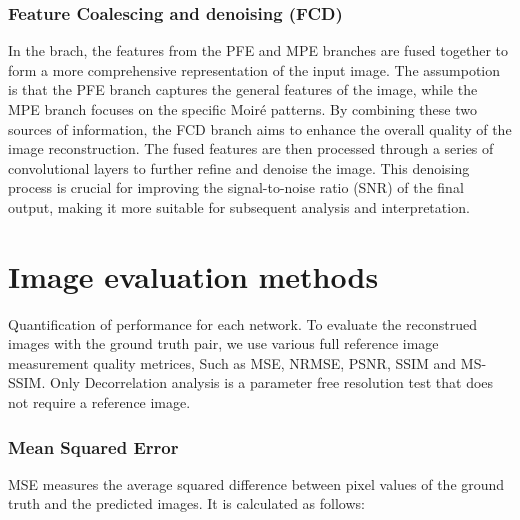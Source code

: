 \documentclass[11pt,
  paper=a4, 
  bibliography=totocnumbered,
	captions=tableheading,
	BCOR=10mm
]{scrreprt}
\theoremstyle{definition}
\begin{document}
\subsection{Feature Coalescing and denoising (FCD)}
In the brach, the features from the PFE and MPE branches are fused together to form a more comprehensive representation of the input image. 
The assumpotion is that the PFE branch captures the general features of the image, while the MPE branch focuses on the specific Moiré patterns.
By combining these two sources of information, the FCD branch aims to enhance the overall quality of the image reconstruction. 
The fused features are then processed through a series of convolutional layers to further refine and denoise the image. 
This denoising process is crucial for improving the signal-to-noise ratio (SNR) of the final output, making it more suitable for subsequent analysis and interpretation.
































\chapter{Image evaluation methods}
\label{sec:eval-metrics}

Quantification of performance for each network. To evaluate the reconstrued
images with the ground truth pair, we use various full reference image
measurement quality metrices, Such as MSE, NRMSE, PSNR, SSIM and MS-SSIM. Only
Decorrelation analysis is a parameter free resolution test that does not require
a reference image.

\subsection{Mean Squared Error}

MSE measures the average squared difference between pixel values of the ground truth and the predicted images. It is calculated as follows:
\end{document}
